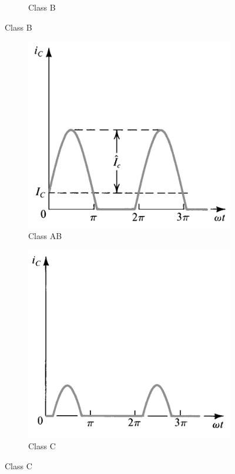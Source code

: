 \begin{figure}[H]
\begin{subfigure}{.4\textwidth}
    \caption{Class B}
  \end{subfigure}
\end{figure}

\begin{figure}[H]
  \centering
  \begin{subfigure}{.4\textwidth}
    \centering
    \includegraphics[width=\linewidth]{figures/Power-AB}
    \caption{Class AB}
  \end{subfigure}
  \begin{subfigure}{.4\textwidth}
    \centering
    \includegraphics[width=\linewidth]{figures/Power-C}
    \caption{Class C}
  \end{subfigure}
\end{figure}

